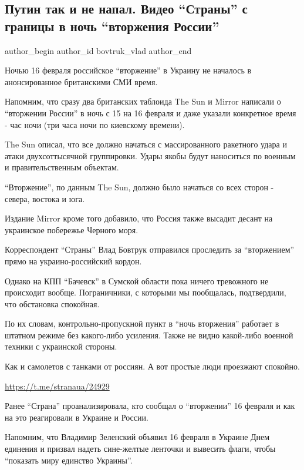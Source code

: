  
 
 
 
 
 
\subsection{Путин так и не напал. Видео \enquote{Страны} с границы в ночь \enquote{вторжения России}}
\label{sec:16_02_2022.stz.news.ua.strana.2.putin_ne_napal_granica}
 
\ifcmt
 author_begin
   author_id bovtruk_vlad
 author_end
\fi

Ночью 16 февраля российское \enquote{вторжение} в Украину не началось в
анонсированное британскими СМИ время.

Напомним, что сразу два британских таблоида The Sun и Mirror написали о
\enquote{вторжении России} в ночь с 15 на 16 февраля и даже указали конкретное
время - час ночи (три часа ночи по киевскому времени).

The Sun описал, что все должно начаться с массированного ракетного удара и
атаки двухсоттысячной группировки. Удары якобы будут наноситься по военным и
правительственным объектам.

\enquote{Вторжение}, по данным The Sun, должно было начаться со всех сторон - севера,
востока и юга. 

Издание Mirror кроме того добавило, что Россия также высадит десант на
украинское побережье Черного моря.

Корреспондент \enquote{Страны} Влад Бовтрук отправился проследить за \enquote{вторжением} прямо
на украино-российский кордон. 

Однако на КПП \enquote{Бачевск} в Сумской области пока ничего тревожного не происходит
вообще. Пограничники, с которыми мы пообщалась, подтвердили, что обстановка
спокойная.

По их словам, контрольно-пропускной пункт в \enquote{ночь вторжения} работает в штатном
режиме без какого-либо усиления. Также не видно какой-либо военной техники с
украинской стороны.

Как и самолетов с танками от россиян. А вот простые люди проезжают спокойно.

\url{https://t.me/stranaua/24929}

Ранее \enquote{Страна} проанализировала, кто сообщал о \enquote{вторжении} 16 февраля и как на
это реагировали в Украине и России.

Напомним, что Владимир Зеленский объявил 16 февраля в Украине Днем единения и
призвал надеть сине-желтые ленточки и вывесить флаги, чтобы \enquote{показать миру
единство Украины}.
